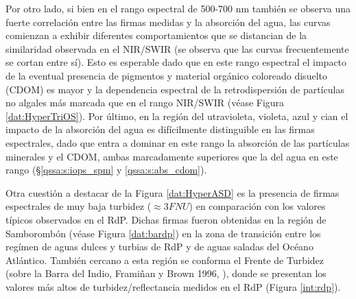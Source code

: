         Por otro lado, si bien en el rango espectral de 500-700 nm también se observa una fuerte correlación entre las firmas medidas y la absorción del agua, las curvas comienzan a exhibir diferentes comportamientos que se distancian de la similaridad observada en el NIR/SWIR (se observa que las curvas frecuentemente se cortan entre sí). Esto es esperable dado que en este rango espectral el impacto de la eventual presencia de pigmentos y material orgánico coloreado disuelto (CDOM) es mayor y la dependencia espectral de la retrodispersión de partículas no algales más marcada que en el rango NIR/SWIR (véase Figura \ref{dat:HyperTriOS}).
        Por último, en la región del utravioleta, violeta, azul y cian el impacto de la absorción del agua es difícilmente distinguible en las firmas espectrales, dado que entra a dominar en este rango la absorción de las partículas minerales y el CDOM, ambas marcadamente superiores que la del agua en este rango (\S \ref{qssa:s:iops_spm} y \ref{qssa:s:abs_cdom}).
        
        Otra cuestión a destacar de la Figura \ref{dat:HyperASD} es la presencia de firmas espectrales de muy baja turbidez ($\approx 3 FNU$) en comparación con los valores típicos observados en el RdP. Dichas firmas fueron obtenidas en la región de Samborombón (véase Figura \ref{dat:bardp}) en la zona de transición entre los regímen de aguas dulces y turbias de RdP y de aguas saladas del Océano Atlántico.
        También cercano a esta región se conforma el Frente de Turbidez (sobre la Barra del Indio, Framiñan y Brown 1996, \cite{framinan1996}), donde se presentan los valores más altos de turbidez/reflectancia medidos en el RdP (Figura \ref{int:rdp}).

